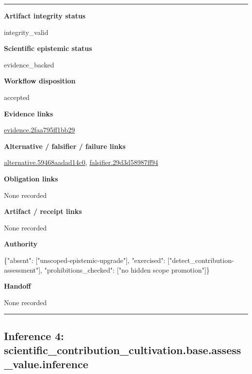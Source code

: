 \documentclass[10pt,a4paper]{article}
\newcommand{\TraceField}[2]{\par\noindent\textbf{#1}\par\noindent #2\par\smallskip}
\newenvironment{TraceDossier}{\par\medskip\noindent\hrule\medskip}{\medskip\hrule\par\medskip}
\begin{document}
\begin{TraceDossier}
\TraceField{Artifact integrity status}{integrity\_\allowbreak{}valid}

\TraceField{Scientific epistemic status}{evidence\_\allowbreak{}backed}

\TraceField{Workflow disposition}{accepted}

\TraceField{Evidence links}{\hyperlink{trace-evidence-2e4a5ac2658dfb791f}{evidence.\allowbreak{}2faa795ff1\allowbreak{}bb29}}

\TraceField{Alternative / falsifier / failure links}{\hyperlink{trace-alternative-27ac985dd71721f262}{alternativ\allowbreak{}e.\allowbreak{}59468aadad\allowbreak{}14c0}, \hyperlink{trace-alternative-b3e27685a9ead899a2}{falsifier.\allowbreak{}29d3d58987\allowbreak{}ff94}}

\TraceField{Obligation links}{None recorded}

\TraceField{Artifact / receipt links}{None recorded}

\TraceField{Authority}{\{"absent":\allowbreak{} ["unscoped\allowbreak{}-\allowbreak{}epistemic-\allowbreak{}upgrade"],\allowbreak{} "exercised\allowbreak{}":\allowbreak{} ["detect\_\allowbreak{}contributi\allowbreak{}on-\allowbreak{}assessment\allowbreak{}"], "prohibiti\allowbreak{}ons\_\allowbreak{}checked":\allowbreak{} ["no hidden scope promotion"\allowbreak{}]\}}

\TraceField{Handoff}{None recorded}

\end{TraceDossier}
\pagebreak[2]\subsection{Inference 4: scientific\allowbreak{}\_\allowbreak{}contributi\allowbreak{}on\_\allowbreak{}cultivatio\allowbreak{}n.\allowbreak{}base.\allowbreak{}assess\_\allowbreak{}value.\allowbreak{}inference}\label{trace-inference-1048cfb551bef0e38c}
\end{document}
